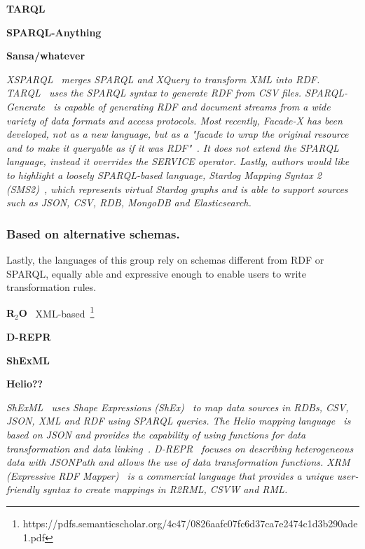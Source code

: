 \noindent\textbf{TARQL}~\parencite{tarql}

\noindent\textbf{SPARQL-Anything}~\parencite{asprino2023sparql-anything}

\noindent\textbf{Sansa/whatever}~\parencite{stadler2023spark}




\textit{XSPARQL~\parencite{Bischof2012xsparql} merges SPARQL and XQuery to transform XML into RDF. TARQL~\parencite{tarql} uses the SPARQL syntax to generate RDF from CSV files. SPARQL-Generate~\parencite{Lefrancois2017sparqlgenerate} is capable of generating RDF and document streams from a wide variety of data formats and access protocols. Most recently, Facade-X has been developed, not as a new language, but as a "\textit{facade} to wrap the original resource and to make it queryable as if it was RDF"~\parencite{asprino2023sparql-anything}. It does not extend the SPARQL language, instead it overrides the SERVICE operator. Lastly, authors would like to highlight a loosely SPARQL-based language, Stardog Mapping Syntax 2 (SMS2)~\parencite{sms2}, which represents virtual Stardog graphs and is able to support sources such as JSON, CSV, RDB, MongoDB and Elasticsearch.}




\subsubsection{Based on alternative schemas.} 
\label{sec:chp2_alternative-languages}

Lastly, the languages of this group rely on schemas different from RDF or SPARQL, equally able and expressive enough to enable users to write transformation rules. 


\noindent\textbf{R$_2$O}~\parencite{barrasa2004r2o} XML-based~\footnote{https://pdfs.semanticscholar.org/4c47/0826aafc07fc6d37ca7e2474c1d3b290ade1.pdf}

\noindent\textbf{D-REPR}~\parencite{Vu2019d-repr}

\noindent\textbf{ShExML}~\parencite{Garcia-Gonzalez2020shexml,garcia2021shexml-challenges}

\noindent\textbf{Helio??}~\parencite{cimmino2022helio}

\textit{ShExML~\parencite{Garcia-Gonzalez2020shexml,garcia2021shexml-challenges} uses Shape Expressions (ShEx)~\parencite{prud2014shex} to map data sources in RDBs, CSV, JSON, XML and RDF using SPARQL queries. The Helio mapping language~\parencite{cimmino2022helio} is based on JSON and provides the capability of using functions for data transformation and data linking~\parencite{cimmino2018hybrid}. D-REPR~\parencite{Vu2019d-repr} focuses on describing heterogeneous data with JSONPath and allows the use of data transformation functions. XRM (Expressive RDF Mapper)~\parencite{xrm} is a commercial language that provides a unique user-friendly syntax to create mappings in R2RML, CSVW and RML.}










